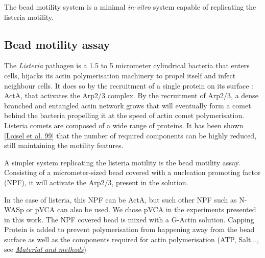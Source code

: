 \documentclass[A4paperpaper,11pt,english]{sphinxmanual}
\begin{document}
The bead motility system is a minimal \emph{in-vitro} system capable of replicating
the listeria motility.


\subsection{Bead motility assay}
\label{parts/part1:bead-motility-assay}\label{parts/part1:id49}
The \emph{Listeria} pathogen is a 1.5 to 5 micrometer cylindrical bacteria that
enters cells, hijacks its actin polymerisation machinery to propel itself and
infect neighbour cells. It does so by the recruitment of a single protein on its
surface : ActA, that activates the Arp2/3 complex. By the recruitment of Arp2/3, a
dense branched and entangled actin network grows that will eventually form a
comet behind the bacteria propelling it at the speed of actin comet
polymerisation. Listeria comets are composed of a wide range of proteins. It has
been shown {\hyperref[parts/part1:loisel1999]{{[}Loisel et al. 99{]}}} that the number of required components can
be highly reduced, still maintaining the motility features.

A simpler system replicating the listeria motility is the bead motility assay.
Consisting of a micrometer-sized bead covered with a nucleation promoting factor (NPF), it will activate the Arp2/3, present in the solution.

In the case of listeria, this NPF can be ActA, but such other NPF such as N-WASp or pVCA can also be used.
We chose pVCA in the experiments presented in this work. The NPF covered
bead is mixed with a G-Actin solution. Capping Protein is added to prevent
polymerisation from happening away from the bead surface as well as the
components required for actin polymerisation (ATP, Salt..., see {\hyperref[parts/part2:m-et-m]{\emph{Material and methods}}})
\end{document}

